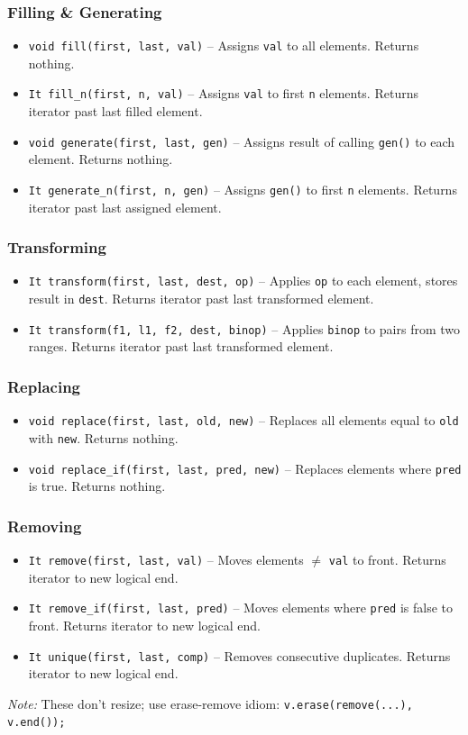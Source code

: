 \subsubsection{Filling \& Generating}
\begin{itemize}
\item \texttt{void fill(first, last, val)} -- Assigns \texttt{val} to all elements. Returns nothing.
\item \texttt{It fill\_n(first, n, val)} -- Assigns \texttt{val} to first \texttt{n} elements. Returns iterator past last filled element.
\item \texttt{void generate(first, last, gen)} -- Assigns result of calling \texttt{gen()} to each element. Returns nothing.
\item \texttt{It generate\_n(first, n, gen)} -- Assigns \texttt{gen()} to first \texttt{n} elements. Returns iterator past last assigned element.
\end{itemize}

\subsubsection{Transforming}
\begin{itemize}
\item \texttt{It transform(first, last, dest, op)} -- Applies \texttt{op} to each element, stores result in \texttt{dest}. Returns iterator past last transformed element.
\item \texttt{It transform(f1, l1, f2, dest, binop)} -- Applies \texttt{binop} to pairs from two ranges. Returns iterator past last transformed element.
\end{itemize}

\subsubsection{Replacing}
\begin{itemize}
\item \texttt{void replace(first, last, old, new)} -- Replaces all elements equal to \texttt{old} with \texttt{new}. Returns nothing.
\item \texttt{void replace\_if(first, last, pred, new)} -- Replaces elements where \texttt{pred} is true. Returns nothing.
\end{itemize}

\subsubsection{Removing}
\begin{itemize}
\item \texttt{It remove(first, last, val)} -- Moves elements $\neq$ \texttt{val} to front. Returns iterator to new logical end.
\item \texttt{It remove\_if(first, last, pred)} -- Moves elements where \texttt{pred} is false to front. Returns iterator to new logical end.
\item \texttt{It unique(first, last, comp)} -- Removes consecutive duplicates. Returns iterator to new logical end.
\end{itemize}
\textit{Note:} These don't resize; use erase-remove idiom: \texttt{v.erase(remove(...), v.end());}

